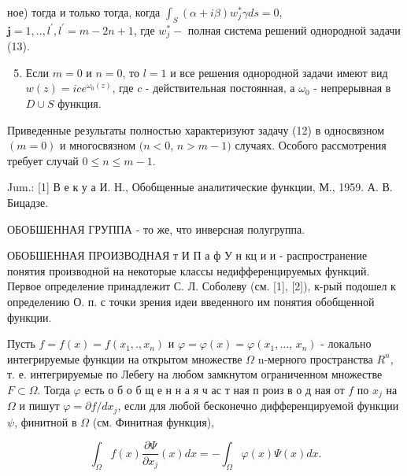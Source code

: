 \documentclass[10pt]{article}
\begin{document}
ное) тогда и только тогда, когда $\int_{S}(\alpha+i \beta) w_{j}^{*} \gamma d s=0$, $\boldsymbol{j}=1, . ., l^{\prime}, l^{\prime}=m-2 n+1$, где $w_{j}^{*}-$ полная система решений однородной задачи (13).



\begin{enumerate}

  \setcounter{enumi}{4}

  \item Если $m=0$ и $n=0$, то $l=1$ и все решения однородной задачи имеют вид $w(z)=i c e^{\omega_{0}(z)}$, где $c$ - действительная постоянная, а $\omega_{0}$ - непрерывная в $D \cup S$ функция.

\end{enumerate}



Приведенные результаты полностью характеризуют задачу (12) в односвязном $(m=0)$ и многосвязном $(n<0$, $n>m-1)$ случаях. Особого рассмотрения требует случай $0 \leqslant n \leqslant m-1$.



Jum.: [1] В е к у а И. Н., Обобщенные аналитические функции, М., 1959. А. В. Бицадзе.



ОБОБШЕННАЯ ГРУППА - то же, что инверсная полугруппа.



ОБОБШЕННАЯ ПРОИЗВОДНАЯ т И П а ф У н кц и и - распространение понятия производной на некоторые классы недифференцируемых функций. Первое определение принадлежит С. Л. Соболеву (см. [1], [2]), к-рый подошел к определению О. п. с точки зрения идеи введенного им понятия обобщенной функции.



Пусть $f=f(x)=f\left(x_{1}, ., x_{n}\right)$ и $\varphi=\varphi(x)=\varphi\left(x_{1}, \ldots\right.$, $\left.x_{n}\right)$ - локально интегрируемые функции на открытом множестве $\Omega$ n-мерного пространства $R^{n}$, т. е. интегрируемые по Лебегу на любом замкнутом ограниченном множестве $F \subset \Omega$. Тогда $\varphi$ есть о б о б щ е н н а я ч ас т ная п роиз в о д ная от $f$ по $x_{j}$ на $\Omega$ и пишут $\varphi=\partial f / d x_{j}$, если для любой бесконечно дифференцируемой функции $\psi$, финитной в $\Omega$ (см. Финитная функция),



\[

\int_{\Omega} f(x) \frac{\partial \Psi}{\partial x_{j}}(x) d x=-\int_{\Omega} \varphi(x) \Psi(x) d x .

\]
\end{document}

